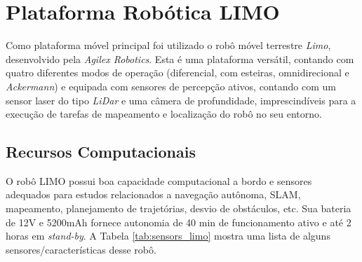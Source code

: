 \section{Plataforma Robótica LIMO}
\label{sec:Plataforma_LIMO}

    Como plataforma móvel principal foi utilizado o robô móvel terrestre \textit{Limo}, desenvolvido pela \textit{Agilex Robotics}\cite{site:Agilex_Robotics}. Esta é uma plataforma versátil, contando com quatro diferentes modos de operação (diferencial, com esteiras, omnidirecional e \textit{Ackermann}) e equipada com sensores de percepção ativos, contando com um sensor laser do tipo \textit{LiDar} e uma câmera de profundidade, imprescindíveis para a execução de tarefas de mapeamento e localização do robô no seu entorno.

    \subsection{Recursos Computacionais}
    \label{sec:Recursos_LIMO}
        O robô LIMO possui boa capacidade computacional a bordo e sensores adequados para estudos relacionados a navegação autônoma, SLAM, mapeamento, planejamento de trajetórias, desvio de obstáculos, etc. Sua bateria de 12V e 5200mAh fornece autonomia de 40 min de funcionamento ativo e até 2 horas em \textit{stand-by}. A Tabela \ref{tab:sensors_limo} mostra uma lista de alguns sensores/características desse robô.

